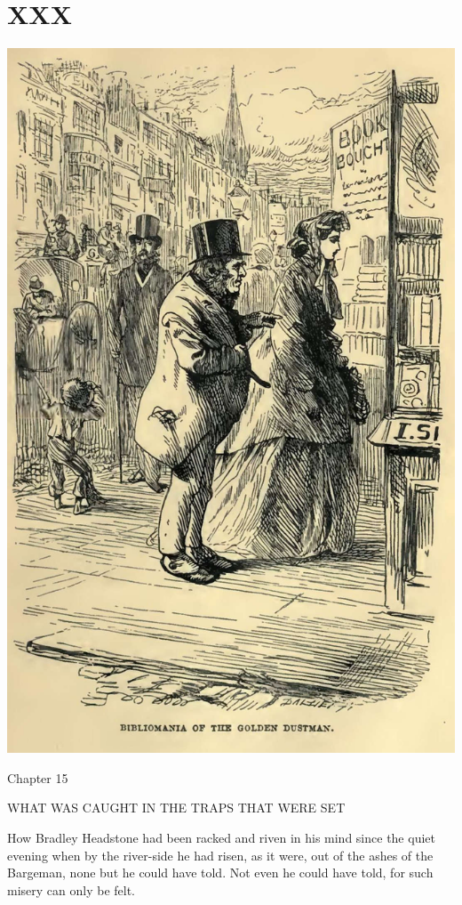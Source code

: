 
\chapter{XXX}

\includegraphics[scale=2.3]{03-05-01}

Chapter 15

WHAT WAS CAUGHT IN THE TRAPS THAT WERE SET


How Bradley Headstone had been racked and riven in his mind since the
quiet evening when by the river-side he had risen, as it were, out of
the ashes of the Bargeman, none but he could have told. Not even he
could have told, for such misery can only be felt.

